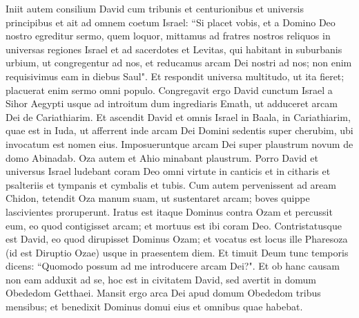 \begin{biblechapter}  
\verse Iniit autem consilium David cum tribunis et centurionibus et universis principibus 
\verse et ait ad omnem coetum Israel: “Si placet vobis, et a Domino Deo nostro egreditur sermo, quem loquor, mittamus ad fratres nostros reliquos in universas regiones Israel et ad sacerdotes et Levitas, qui habitant in suburbanis urbium, ut congregentur ad nos, 
\verse et reducamus arcam Dei nostri ad nos; non enim requisivimus eam in diebus Saul". 
\verse Et respondit universa multitudo, ut ita fieret; placuerat enim sermo omni populo. 
\verse Congregavit ergo David cunctum Israel a Sihor Aegypti usque ad introitum dum ingrediaris Emath, ut adduceret arcam Dei de Cariathiarim. 
\verse Et ascendit David et omnis Israel in Baala, in Cariathiarim, quae est in Iuda, ut afferrent inde arcam Dei Domini sedentis super cherubim, ubi invocatum est nomen eius. 
\verse Imposueruntque arcam Dei super plaustrum novum de domo Abinadab. Oza autem et Ahio minabant plaustrum. 
\verse Porro David et universus Israel ludebant coram Deo omni virtute in canticis et in citharis et psalteriis et tympanis et cymbalis et tubis. 
\verse Cum autem pervenissent ad aream Chidon, tetendit Oza manum suam, ut sustentaret arcam; boves quippe lascivientes proruperunt. 
\verse Iratus est itaque Dominus contra Ozam et percussit eum, eo quod contigisset arcam; et mortuus est ibi coram Deo. 
\verse Contristatusque est David, eo quod dirupisset Dominus Ozam; et vocatus est locus ille Pharesoza (id est Diruptio Ozae) usque in praesentem diem. 
\verse Et timuit Deum tunc temporis dicens: “Quomodo possum ad me introducere arcam Dei?". 
\verse Et ob hanc causam non eam adduxit ad se, hoc est in civitatem David, sed avertit in domum Obededom Getthaei. 
\verse Mansit ergo arca Dei apud domum Obededom tribus mensibus; et benedixit Dominus domui eius et omnibus quae habebat. 
\end{biblechapter}

